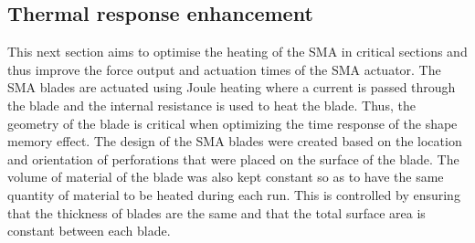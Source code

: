 \subsection{Thermal response enhancement}\label{ssec:WA_TRE}

This next section aims to optimise the heating of the SMA in critical sections and thus improve the force output and actuation times of the SMA actuator. The SMA blades are actuated using Joule heating where a current is passed through the blade and the internal resistance is used to heat the blade. Thus, the geometry of the blade is critical when optimizing the time response of the shape memory effect. The design of the SMA blades were created based on the location and orientation of perforations that were placed on the surface of the blade. The volume of material of the blade was also kept constant so as to have the same quantity of material to be heated during each run. This is controlled by ensuring that the thickness of blades are the same and that the total surface area is constant between each blade.

